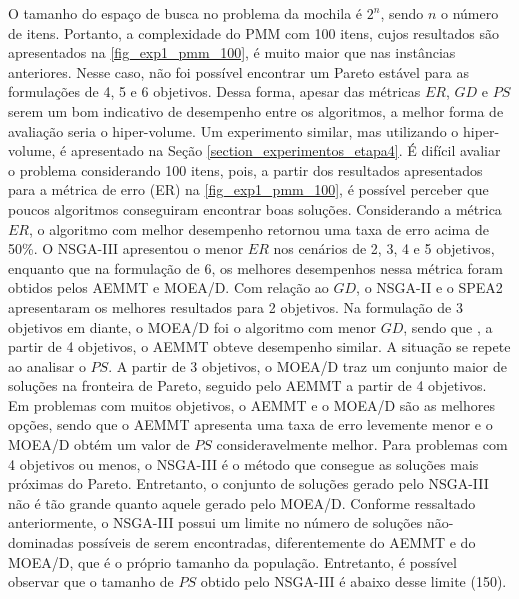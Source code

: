 O tamanho do espaço de busca no problema da mochila é $2^n$, sendo $n$ o número de itens. Portanto, a complexidade do PMM com 100 itens, cujos resultados são apresentados na \autoref{fig_exp1_pmm_100}, é muito maior que nas instâncias anteriores. Nesse caso, não foi possível encontrar um Pareto estável para as formulações de 4, 5 e 6 objetivos. Dessa forma, apesar das métricas $ER$, $GD$ e $PS$ serem um bom indicativo de desempenho entre os algoritmos, a melhor forma de avaliação seria o hiper-volume. Um experimento similar, mas utilizando o hiper-volume, é apresentado na Seção \ref{section_experimentos_etapa4}. É difícil avaliar o problema considerando 100 itens, pois, a partir dos resultados apresentados para a métrica de erro (ER) na \autoref{fig_exp1_pmm_100}, é possível perceber que poucos algoritmos conseguiram encontrar boas soluções. Considerando a métrica $ER$, o algoritmo com melhor desempenho retornou uma taxa de erro acima de 50\%. O NSGA-III apresentou o menor $ER$ nos cenários de 2, 3, 4 e 5 objetivos, enquanto que na formulação de 6, os melhores desempenhos nessa métrica foram obtidos pelos AEMMT e MOEA/D. Com relação ao $GD$, o NSGA-II e o SPEA2 apresentaram os melhores resultados para 2 objetivos. Na formulação de 3 objetivos em diante, o MOEA/D foi o algoritmo com menor $GD$, sendo que , a partir de 4 objetivos, o AEMMT obteve desempenho similar. A situação se repete ao analisar o $PS$. A partir de 3 objetivos, o MOEA/D traz um conjunto maior de soluções na fronteira de Pareto, seguido pelo AEMMT a partir de 4 objetivos. Em problemas com muitos objetivos, o AEMMT e o MOEA/D são as melhores opções, sendo que o AEMMT apresenta uma taxa de erro levemente menor e o MOEA/D obtém um valor de $PS$ consideravelmente melhor. Para problemas com 4 objetivos ou menos, o NSGA-III é o método que consegue as soluções mais próximas do Pareto. Entretanto, o conjunto de soluções gerado pelo NSGA-III não é tão grande quanto aquele gerado pelo MOEA/D. Conforme ressaltado anteriormente, o NSGA-III possui um limite no número de soluções não-dominadas possíveis de serem encontradas, diferentemente do AEMMT e do MOEA/D, que é o próprio tamanho da população. Entretanto, é possível observar que o tamanho de $PS$ obtido pelo NSGA-III é abaixo desse limite (150).

